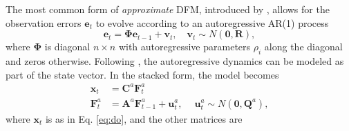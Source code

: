 \documentclass[a4paper]{article}
\begin{document}
The most common form of \emph{approximate} DFM, introduced by \citet{chamberlain2983arbitrage}, allows for the observation errors $\textbf{e}_t$ to evolve according to an autoregressive AR(1) process
\begin{equation} \label{eq:ar1}
\textbf{e}_t = \mathbf{\Phi} \textbf{e}_{t-1} + \textbf{v}_t,\quad \textbf{v}_t\sim N(\textbf{0}, \textbf{R}),
\end{equation}
where $\mathbf{\Phi}$ is diagonal $n\times n$ with autoregressive parameters $\rho_i$ along the diagonal and zeros otherwise. Following \citet{banbura2014maximum}, the autoregressive dynamics can be modeled as part of the state vector. 
In the stacked form, the model becomes 
\begin{align} \label{eq:doar1}
\textbf{x}_t &= \textbf{C}^a \textbf{F}_t^a \\
\textbf{F}_t^a &= \textbf{A}^a\textbf{F}^a_{t-1} + \textbf{u}_t^a, \quad\ \textbf{u}_t^a\sim  N(\textbf{0}, \textbf{Q}^a),
\end{align}
where $\textbf{x}_t$ is as in Eq. \ref{eq:do}, and the other matrices are
\end{document}
